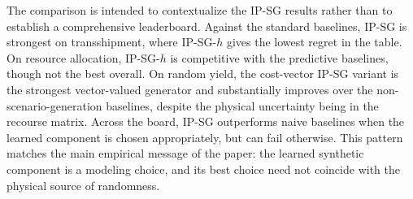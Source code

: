 \documentclass{article}
\newcommand{\1}{\mathbf{1}}
\theoremstyle{plain}
\theoremstyle{definition}
\theoremstyle{remark}
\begin{document}
The comparison is intended to contextualize the IP-SG results rather than to establish a comprehensive leaderboard.
Against the standard baselines, IP-SG is strongest on transshipment, where IP-SG-$h$ gives the lowest regret in the table.
On resource allocation, IP-SG-$h$ is competitive with the predictive baselines, though not the best overall.
On random yield, the cost-vector IP-SG variant is the strongest vector-valued generator and substantially improves over the non-scenario-generation baselines, despite the physical uncertainty being in the recourse matrix.
Across the board, IP-SG outperforms naive baselines when the learned component is chosen appropriately, but can fail otherwise.
This pattern matches the main empirical message of the paper: the learned synthetic component is a modeling choice, and its best choice need not coincide with the physical source of randomness.

\clearpage

\end{document}
